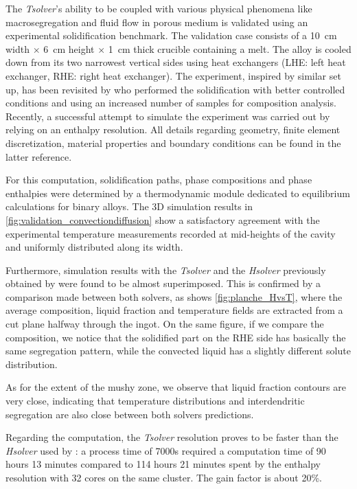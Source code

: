 The \emph{Tsolver}’s ability to be coupled with various physical phenomena like macrosegregation and fluid flow 
in porous medium is validated using an experimental solidification benchmark. 
The validation case consists of a \SI{10}{\centi \metre}
width $\times$ \SI{6}{\centi \metre} height $\times$ \SI{1}{\centi \metre} thick crucible containing 
a  melt. The alloy is cooled down from its two 
narrowest vertical sides using heat exchangers (LHE: left heat exchanger, RHE: right heat exchanger). The 
experiment, inspired by \citet{hebditch_observations_1974} similar set up, has been 
revisited by \citet{hachani_experimental_2012} who performed the solidification with better 
controlled conditions and using an increased number of samples for composition analysis. Recently, a successful 
attempt to simulate the experiment was carried out by \citet{carozzani_direct_2013} relying on an enthalpy resolution. 
All details regarding geometry, finite element discretization, material properties 
and boundary conditions can be found in the latter reference. 

For this computation, solidification paths, phase compositions and phase enthalpies were determined by a thermodynamic 
module dedicated to equilibrium calculations for binary alloys. 
The 3D simulation results in \cref{fig:validation_convectiondiffusion}
show a satisfactory agreement with the experimental temperature measurements recorded at mid-heights of the cavity and uniformly 
distributed along its width. 

Furthermore, simulation results with the \emph{Tsolver} and the \emph{Hsolver} 
previously obtained by \citet{carozzani_direct_2013} were 
found to be almost superimposed. This is confirmed by a comparison made 
between both solvers, as shows \cref{fig:planche_HvsT}, where the average composition, 
liquid fraction and temperature fields are extracted from a cut plane halfway through the ingot. 
On the same figure, if we compare the composition, we notice that the solidified part on the RHE 
side has basically the same segregation pattern, while the convected liquid has a slightly different 
solute distribution. 

As for the extent of the mushy zone, we observe that liquid
fraction contours are very close, indicating that temperature distributions and interdendritic segregation are also close between 
both solvers predictions. 

Regarding the computation, the \emph{Tsolver} resolution proves to be 
faster than the \emph{Hsolver} used by \citet{carozzani_direct_2013}: a process time of 7000s required a computation time of 90 hours 
13 minutes compared to 114 hours 21 minutes spent by the enthalpy resolution with 32 cores on the same cluster. The gain factor 
is about 20\%.

